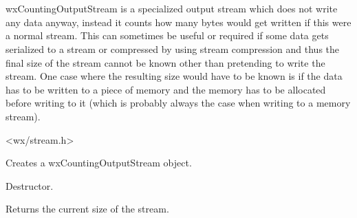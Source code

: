 \section{}\label{wxcountingoutputstream}

wxCountingOutputStream is a specialized output stream which does not write any data anyway,
instead it counts how many bytes would get written if this were a normal stream. This
can sometimes be useful or required if some data gets serialized to a stream or compressed
by using stream compression and thus the final size of the stream cannot be known other
than pretending to write the stream. One case where the resulting size would have to be
known is if the data has to be written to a piece of memory and the memory has to be
allocated before writing to it (which is probably always the case when writing to a 
memory stream).




<wx/stream.h>




Creates a wxCountingOutputStream object.



Destructor.



Returns the current size of the stream.

